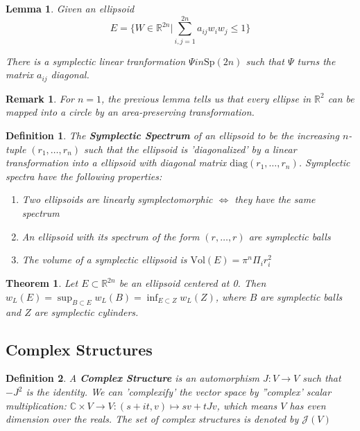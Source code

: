 \documentclass{article}
\newtheorem{thm}{Theorem}
\newtheorem{defn}{Definition}
\newtheorem{rmk}{Remark}
\newtheorem{lem}{Lemma}
\begin{document}
\begin{lem}

Given an ellipsoid
\[E = \{W \in \mathbb{R}^{2n} \vert \sum_{i,j=1}^{2n} a_{ij} w_i w_j \leq 1 \}\]

There is a symplectic linear tranformation $\Psi in \mathrm{Sp}(2n)$ such that $\Psi$ turns the matrix $a_{ij}$ diagonal.

\end{lem}

\begin{rmk}

For $n=1$, the previous lemma tells us that every ellipse in $\mathbb{R}^2$ can be mapped into a circle by an area-preserving transformation. 

\end{rmk}

\begin{defn}

The \textbf{Symplectic Spectrum} of an ellipsoid to be the increasing $n$-tuple $(r_1, \ldots, r_n)$ such that the ellipsoid is 'diagonalized' by a linear transformation into a ellipsoid with diagonal matrix $\mathrm{diag}(r_1, \ldots, r_n)$. Symplectic spectra have the following properties:

\begin{enumerate}
    \item Two ellipsoids are linearly symplectomorphic $\iff$ they have the same spectrum
    \item An ellipsoid with its spectrum of the form $(r,\ldots,r)$ are symplectic balls
    \item The volume of a symplectic ellipsoid is $\mathrm{Vol}(E) = \pi^n \Pi_i r_i^2$
\end{enumerate}

\end{defn}


\begin{thm}

Let $E \subset \mathbb{R}^{2n}$ be an ellipsoid centered at 0. Then $ w_L(E) = \sup_{B\subset E} w_L(B) = \inf_{E \subset Z} w_L(Z)$, where $B$ are symplectic balls and $Z$ are symplectic cylinders.

\end{thm}

\subsection{Complex Structures}

\begin{defn}

A \textbf{Complex Structure} is an automorphism $J: V \to V$ such that $-J^2$ is the identity. We can 'complexify' the vector space by ''complex' scalar multiplication: $\mathbb{C}\times V \to V: (s+i t, v) \mapsto sv + tJv$, which means $V$ has even dimension over the reals. The set of complex structures is denoted by $\mathcal{J}(V)$

\end{defn}
\end{document}

